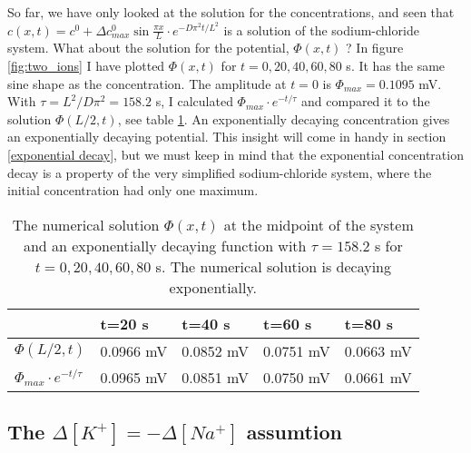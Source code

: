 \documentclass{article}
\begin{document}
So far, we have only looked at the solution for the concentrations, and seen that $c(x,t) =c^0 + \Delta c^0_{max} \sin \frac{ \pi x}{L}\cdot e^{-D\pi^2 t /L^2}$ is a solution of the sodium-chloride system. What about the solution for the potential, $\Phi(x,t)$ ? In figure \ref{fig:two_ions} I have plotted $\Phi(x,t)$ for $t=0,20,40,60,80$ s. It has the same sine shape as the concentration. The amplitude at $t=0$ is $\Phi_{max} = 0.1095$ mV. With $\tau = L^2/D\pi^2 = 158.2$ s, I calculated $\Phi_{max} \cdot e^{-t/{\tau}}$ and compared it to the solution $\Phi(L/2,t)$, see table \ref{tab:error2}. An exponentially decaying concentration gives an exponentially decaying potential. This insight will come in handy in section \ref{exponential decay}, but we must keep in mind that the exponential concentration decay is a property of the very simplified sodium-chloride system, where the initial concentration had only one maximum. 

\begin{table}[h!]
  \centering
  \caption{The numerical solution $\Phi(x,t)$ at the midpoint of the system and an exponentially decaying function with $\tau = 158.2$ s for $t=0,20,40,60,80$ s. The numerical solution is decaying exponentially. }
  \label{tab:error2}
  \begin{tabular}{l||l|l|l|l}
 & t=20 s & t=40 s & t=60 s & t=80 s\\
 \hline
$\Phi(L/2,t)$  & 0.0966 mV &  0.0852 mV & 0.0751 mV & 0.0663 mV\\
\hline
$\Phi_{max} \cdot e^{-t/{\tau}}$  & 0.0965 mV & 0.0851 mV & 0.0750 mV & 0.0661 mV\\


 \end{tabular}
\end{table}


\subsection{The $\Delta [K^+] = - \Delta [Na^+] $ assumtion}\label{The K/Na assumtion}
\end{document}
